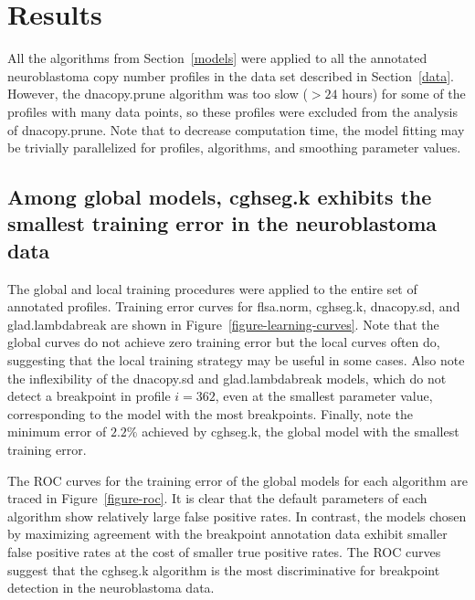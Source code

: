 \documentclass{bioinfo}
\newcommand{\model}[1]{#1}
\begin{document}
\section{Results}\label{results}

All the algorithms from Section~\ref{models} were applied to all the
annotated neuroblastoma copy number profiles in the data set described
in Section~\ref{data}. 
However, the dnacopy.prune algorithm was too slow ($>24$ hours) for some
of the profiles with many data points, so these profiles were excluded
from the analysis of dnacopy.prune. Note that to decrease computation
time, the model fitting may be trivially parallelized for profiles,
algorithms, and smoothing parameter values.

\subsection{Among global models, \model{cghseg.k} exhibits the
  smallest training error in the neuroblastoma data}

The global and local training procedures were applied to the entire
set of annotated profiles. Training error curves for flsa.norm,
cghseg.k, dnacopy.sd, and glad.lambdabreak are shown in
Figure~\ref{figure-learning-curves}. Note that the global curves do
not achieve zero training error but the local curves often do,
suggesting that the local training strategy may be useful in some
cases. Also note the inflexibility of the \model{dnacopy.sd} and
\model{glad.lambdabreak} models, which do not detect a breakpoint in
profile $i=362$, even at the smallest parameter value, corresponding
to the model with the most breakpoints. Finally, note the minimum
error of $2.2\%$ achieved by \model{cghseg.k}, the global model with
the smallest training error.

The ROC curves for the training error of the global models for each
algorithm are traced in Figure~\ref{figure-roc}. It is clear that the
default parameters of each algorithm show relatively large false
positive rates. In contrast, the models chosen by maximizing agreement
with the breakpoint annotation data exhibit smaller false positive
rates at the cost of smaller true positive rates. The ROC curves
suggest that the \model{cghseg.k} algorithm is the most discriminative
for breakpoint detection in the neuroblastoma data.
\end{document}
